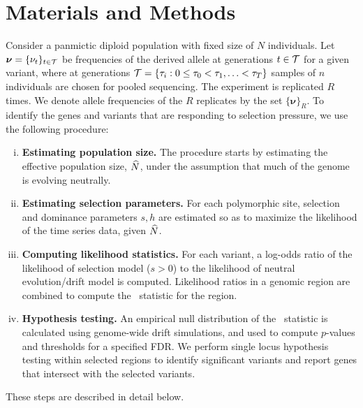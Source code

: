 \section{Materials and Methods}
\label{sec:method}
Consider a panmictic diploid population with fixed size of $N$
individuals.  Let $\bm{ \nu} =\{\nu_t\}_{t\in{\cal T}}$ be frequencies of
the derived allele at generations $t\in{\cal T}$ for a given variant, where
at generations ${\cal T}= \{\tau_i: 0\le \tau_0<\tau_1,\ldots< \tau_T\}$
samples of $n$ individuals are chosen for pooled sequencing. The
experiment is replicated $R$ times. We denote allele frequencies of
the $R$ replicates by the set $\{\bm{\nu}\}_R$.  To identify the genes
and variants that are responding to selection pressure, we use the
following procedure:
\begin{enumerate}[(i)]
\item {\bf Estimating population size.} The procedure starts by
  estimating the effective population size, $\widehat{N}$, under the
  assumption that much of the genome is evolving neutrally.
\item {\bf Estimating selection parameters.} For each polymorphic
  site, selection and dominance parameters $s,h$ are estimated so
  as to maximize the likelihood of the time series data, given $\widehat{N}$.
\item {\bf Computing likelihood statistics.} For each variant, a
  log-odds ratio of the likelihood of selection model ($s>0$) to the
  likelihood of neutral evolution/drift model is computed. Likelihood
  ratios in a genomic region are combined to compute the \comale\
  statistic for the region.
\item {\bf Hypothesis testing.} An empirical null distribution of the
  \comale\ statistic is calculated using genome-wide drift
  simulations, and used to compute $p$-values and thresholds for a
  specified FDR. We perform single locus hypothesis testing within
  selected regions to identify significant variants and report genes
  that intersect with the selected variants.
\end{enumerate}
These steps are described in detail below.

